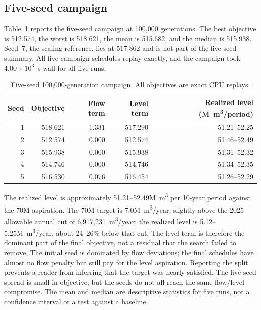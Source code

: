 \documentclass[a4paper,fleqn]{cas-sc}
\begin{document}
\subsection{Five-seed campaign}

Table~\ref{tab:five-seed} reports the five-seed campaign at 100,000 generations. The best objective is
512.574, the worst is 518.621, the mean is 515.682, and the median is 515.938. Seed~7, the scaling
reference, lies at 517.862 and is not part of the five-seed summary. All five campaign schedules replay
exactly, and the campaign took $4.00\times10^{3}$~s wall for all five runs.

\begin{table}[t]
\centering
\caption{Five-seed 100,000-generation campaign. All objectives are exact CPU replays.}
\label{tab:five-seed}
\small
\begin{tabular}{rrrrr}
\toprule
Seed & Objective & Flow term & Level term & Realized level (M~m\textsuperscript{3}/period) \\
\midrule
1 & 518.621 & 1.331 & 517.290 & 51.21--52.25 \\
2 & 512.574 & 0.000 & 512.574 & 51.46--52.49 \\
3 & 515.938 & 0.000 & 515.938 & 51.31--52.32 \\
4 & 514.746 & 0.000 & 514.746 & 51.34--52.35 \\
5 & 516.530 & 0.076 & 516.454 & 51.26--52.29 \\
\bottomrule
\end{tabular}
\end{table}

The realized level is approximately 51.21--52.49M~m\textsuperscript{3} per 10-year period against the
70M aspiration. The 70M target is 7.0M~m\textsuperscript{3}/year, slightly above the 2025 allowable
annual cut of 6,917,231~m\textsuperscript{3}/year; the realized level is 5.12--5.25M~m\textsuperscript{3}/year,
about 24--26\% below that cut. The level term is therefore the dominant part of the final objective, not a residual
that the search failed to remove. The initial seed is dominated by flow deviations; the final schedules
have almost no flow penalty but still pay for the level aspiration. Reporting the split prevents a
reader from inferring that the target was nearly satisfied. The five-seed spread is small in objective,
but the seeds do not all reach the same flow/level compromise. The mean and median are descriptive
statistics for five runs, not a confidence interval or a test against a baseline.
\end{document}
